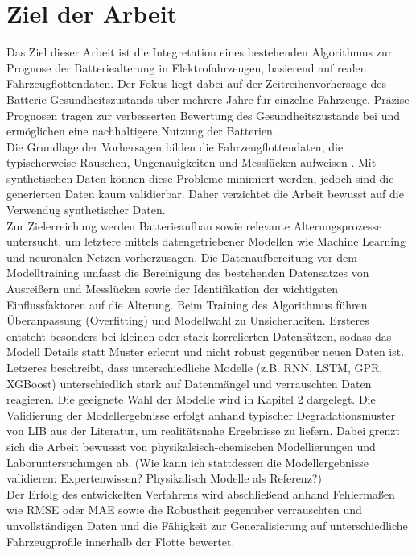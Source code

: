 \section{Ziel der Arbeit}
Das Ziel dieser Arbeit ist die Integretation eines bestehenden Algorithmus zur Prognose der Batteriealterung in Elektrofahrzeugen, basierend auf realen Fahrzeugflottendaten. Der Fokus liegt dabei auf der Zeitreihenvorhersage des Batterie-Gesundheitszustands über mehrere Jahre für einzelne Fahrzeuge. Präzise Prognosen tragen zur verbesserten Bewertung des Gesundheitszustands bei und ermöglichen eine nachhaltigere Nutzung der Batterien.
\\
Die Grundlage der Vorhersagen bilden die Fahrzeugflottendaten, die typischerweise Rauschen, Ungenauigkeiten und Messlücken aufweisen \cite{idEigeneFlottenDaten}. Mit synthetischen Daten können diese Probleme minimiert werden, jedoch sind die generierten Daten kaum validierbar. Daher verzichtet die Arbeit bewusst auf die Verwendug synthetischer Daten.
\\
Zur Zielerreichung werden Batterieaufbau sowie relevante Alterungsprozesse untersucht, um letztere mittels datengetriebener Modellen wie Machine Learning und neuronalen Netzen vorherzusagen. Die Datenaufbereitung vor dem Modelltraining umfasst die Bereinigung des bestehenden Datensatzes von Ausreißern und Messlücken sowie der Identifikation der wichtigsten Einflussfaktoren auf die Alterung. Beim Training des Algorithmus führen Überanpassung (Overfitting) und Modellwahl zu Unsicherheiten. Ersteres entsteht besonders bei kleinen oder stark korrelierten Datensätzen, sodass das Modell Details statt Muster erlernt und nicht robust gegenüber neuen Daten ist. Letzeres beschreibt, dass unterschiedliche Modelle (z.B. RNN, LSTM, GPR, XGBoost) unterschiedlich stark auf Datenmängel und verrauschten Daten reagieren. Die geeignete Wahl der Modelle wird in Kapitel 2 dargelegt.
Die Validierung der Modellergebnisse erfolgt anhand typischer Degradationsmuster von \ac{LIB} aus der Literatur, um realitätsnahe Ergebnisse zu liefern. Dabei grenzt sich die Arbeit bewussst von physikalsisch-chemischen Modellierungen und Laboruntersuchungen ab. (Wie kann ich stattdessen die Modellergebnisse validieren: Expertenwissen? Physikalisch Modelle als Referenz?)
\\
Der Erfolg des entwickelten Verfahrens wird abschließend anhand Fehlermaßen wie RMSE oder MAE sowie die Robustheit gegenüber verrauschten und unvollständigen Daten und die Fähigkeit zur Generalisierung auf unterschiedliche Fahrzeugprofile innerhalb der Flotte bewertet.
\pagebreak
